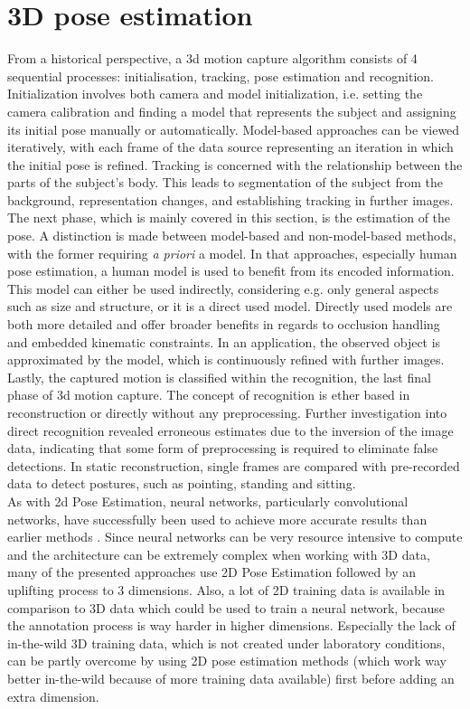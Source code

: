 \section{3D pose estimation}
From a historical perspective, a 3d motion capture algorithm consists of 4 sequential processes: initialisation, tracking, pose estimation and recognition. Initialization involves both camera and model initialization, i.e. setting the camera calibration and finding a model that represents the subject and assigning its initial pose manually or automatically. Model-based approaches can be viewed iteratively, with each frame of the data source representing an iteration in which the initial pose is refined. Tracking is concerned with the relationship between the parts of the subject's body. This leads to segmentation of the subject from the background, representation changes, and establishing tracking in further images. The next phase, which is mainly covered in this section, is the estimation of the pose. A distinction is made between model-based and non-model-based methods, with the former requiring  \emph{a priori} a model. In that approaches, especially human pose estimation, a human model is used to benefit from its encoded information. This model can either be used indirectly, considering e.g. only general aspects such as size and structure, or it is a direct used model. Directly used models are both more detailed and offer broader benefits in regards to occlusion handling and embedded kinematic constraints. In an application, the observed object is approximated by the model, which is continuously refined with further images. Lastly, the captured motion is classified within the recognition, the last final phase of 3d motion capture. The concept of recognition is ether based in reconstruction or directly without any preprocessing. Further investigation \cite{sumi} into direct recognition revealed erroneous estimates due to the inversion of the image data, indicating that some form of preprocessing is required to eliminate false detections. In static reconstruction, single frames are compared with pre-recorded data to detect postures, such as pointing, standing and sitting. \cite{summary80s}
\\
As with 2d Pose Estimation, neural networks, particularly convolutional networks, have successfully been used to achieve more accurate results than earlier methods \cite{wang_deep_2021, Chen2016, Chen_2017_CVPR, Tome_2017_CVPR, Andrikula2010, Ye2011, Martinez_2017_ICCV}. Since neural networks can be very resource intensive to compute and the architecture can be extremely complex when working with 3D data, many  of the presented approaches use 2D Pose Estimation followed by an uplifting process to 3 dimensions.  Also, a lot of 2D training data is available in comparison to 3D data which could be used to train a neural network, because the annotation process is way harder in higher dimensions. Especially the lack of in-the-wild 3D training data, which is not created under laboratory conditions, can be partly overcome by using 2D pose estimation methods (which work way better in-the-wild because of more training data available) first before adding an extra dimension.
